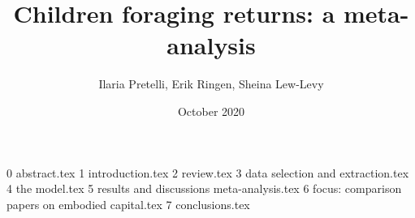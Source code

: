 \documentclass{article}
\title{Children foraging returns: a meta-analysis}
\author{Ilaria Pretelli, Erik Ringen, Sheina Lew-Levy}
\date{October 2020}
\begin{document}
\maketitle
\linenumbers


{0 abstract.tex}
{1 introduction.tex}
{2 review.tex}
{3 data selection and extraction.tex}
{4 the model.tex}
{5 results and discussions meta-analysis.tex}
{6 focus: comparison papers on embodied capital.tex}
{7 conclusions.tex}




\end{document}
